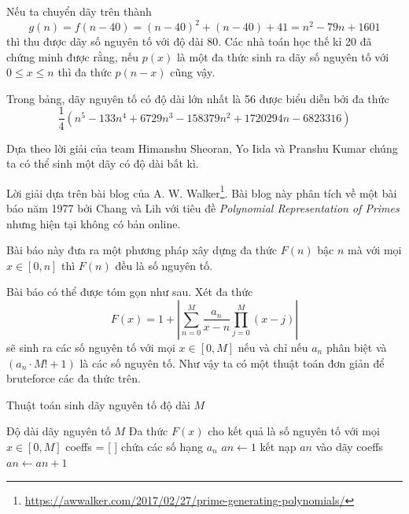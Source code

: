 Nếu ta chuyển dãy trên thành
\begin{equation*}
    g(n) = f(n-40) = (n-40)^2 + (n-40) + 41 = n^2 - 79 n + 1601
\end{equation*}
thì thu được dãy số nguyên tố với độ dài 80. Các nhà toán học thế kỉ 20 đã chứng minh được rằng, nếu $p(x)$ là một đa thức sinh ra dãy số nguyên tố với $0 \leqslant x \leqslant n$ thì đa thức $p(n-x)$ cũng vậy.

Trong bảng, dãy nguyên tố có độ dài lớn nhất là 56 được biểu diễn bởi đa thức
\begin{equation*}
    \frac{1}{4} \left( n^5 - 133 n^4 + 6729 n^3 - 158379 n^2 + 1720294 n - 6823316 \right)
\end{equation*}

Dựa theo lời giải của team Himanshu Sheoran, Yo Iida và Pranshu Kumar chúng ta có thể sinh một dãy có độ dài bất kì.

Lời giải dựa trên bài blog của A. W. Walker\footnote{\url{https://awwalker.com/2017/02/27/prime-generating-polynomials/}}. Bài blog này phân tích về một bài báo năm 1977 bởi Chang và Lih với tiêu đề \emph{Polynomial Representation of Primes} nhưng hiện tại không có bản online.

Bài báo này đưa ra một phương pháp xây dựng đa thức $F(n)$ bậc $n$ mà với mọi $x \in [0, n]$ thì $F(n)$ đều là số nguyên tố.

Bài báo có thể được tóm gọn như sau. Xét đa thức
\begin{equation*}
    F(x) = 1 + \left| \sum_{n=0}^{M} \frac{a_n}{x - n} \prod_{j = 0}^{M} (x - j) \right|
\end{equation*}
sẽ sinh ra các số nguyên tố với mọi $x \in [0, M]$ nếu và chỉ nếu $a_n$ phân biệt và $(a_n \cdot M! + 1)$ là các số nguyên tố. Như vậy ta có một thuật toán đơn giản để bruteforce các đa thức trên.

\begin{algorithm}[H]
    \caption{Thuật toán sinh dãy nguyên tố độ dài $M$}
    \begin{algorithmic}
        \Require Độ dài dãy nguyên tố $M$
        \Ensure Đa thức $F(x)$ cho kết quả là số nguyên tố với mọi $x \in [0, M]$
        \State coeffs = [ ] chứa các số hạng $a_n$
        \State $an \gets 1$
                \State kết nạp $an$ vào dãy coeffs
            \EndIf
            \State $an \gets an + 1$
        \EndWhile
    \end{algorithmic}
\end{algorithm}


